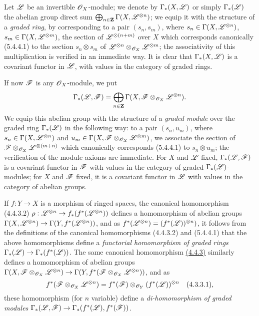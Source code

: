 \begin{env}[5.4.6]
\label{env-0.5.4.6}
Let $\mathscr{L}$ be an invertible $\mathscr{O}_X$-module; we denote by $\Gamma_*(X,\mathscr{L})$
or simply $\Gamma_*(\mathscr{L})$ the abelian group direct sum
$\bigoplus_{n\in\mathbf{Z}}\Gamma(X,\mathscr{L}^{\otimes n})$; we equip it with the
structure of a {\em graded ring}, by corresponding to a pair $(s_n,s_m)$, where
$s_n\in\Gamma(X,\mathscr{L}^{\otimes n})$, $s_m\in\Gamma(X,\mathscr{L}^{\otimes m})$, the
section of $\mathscr{L}^{\otimes(n+m)}$ over $X$ which corresponds canonically
(5.4.4.1) to the section $s_n\otimes s_m$ of
$\mathscr{L}^{\otimes n}\otimes_{\mathscr{O}_X}\mathscr{L}^{\otimes m}$; the associativity of this
multiplication is verified in an immediate way. It is clear that
$\Gamma_*(X,\mathscr{L})$ is a covariant functor in $\mathscr{L}$, with values in the
category of graded rings.

If now $\mathscr{F}$ is any $\mathscr{O}_X$-module, we put
\[
  \Gamma_*(\mathscr{L},\mathscr{F})
  =\bigoplus_{n\in\mathbf{Z}}\Gamma(X,\mathscr{F}\otimes_{\mathscr{O}_X}\mathscr{L}^{\otimes n}).
\]
We equip this abelian group with the structure of a {\em graded module} over
the graded ring $\Gamma_*(\mathscr{L})$ in the following way: to a pair $(s_n,u_m)$,
where $s_n\in\Gamma(X,\mathscr{L}^{\otimes n})$ and
$u_m\in\Gamma(X,\mathscr{F}\otimes_{\mathscr{O}_X}\mathscr{L}^{\otimes m})$, we associate the
section of $\mathscr{F}\otimes_{\mathscr{O}_X}\mathscr{L}^{\otimes(m+n)}$ which canonically
corresponds (5.4.4.1) to $s_n\otimes u_m$; the verification of the module axioms
are immediate. For $X$ and $\mathscr{L}$ fixed, $\Gamma_*(\mathscr{L},\mathscr{F})$ is a
covariant functor in $\mathscr{F}$ with values in the category of graded
$\Gamma_*(\mathscr{L})$-modules; for $X$ and $\mathscr{F}$ fixed, it is a covariant
functor in $\mathscr{L}$ with values in the category of abelian groups.

If $f:Y\to X$ is a morphism of ringed spaces, the canonical homomorphism
(4.4.3.2) $\rho:\mathscr{L}^{\otimes n}\to f_*(f^*(\mathscr{L}^{\otimes n}))$ defines a
homomorphism of abelian groups
$\Gamma(X,\mathscr{L}^{\otimes n})\to\Gamma(Y,f^*(\mathscr{L}^{\otimes n}))$, and as
$f^*(\mathscr{L}^{\otimes n})=(f^*(\mathscr{L}))^{\otimes n})$, it follows from the
definitions of the canonical homomorphisms (4.4.3.2) and (5.4.4.1) that the
above homomorphisms define a {\em functorial homomorphism of graded rings
$\Gamma_*(\mathscr{L})\to\Gamma_*(f^*(\mathscr{L}))$}. The same canonical homomorphism
\hyperref[env-0.4.4.3]{(4.4.3)} similarly defines a homomorphism of abelian groups
$\Gamma(X,\mathscr{F}\otimes_{\mathscr{O}_X}\mathscr{L}^{\otimes n})
  \to\Gamma(Y,f^*(\mathscr{F}\otimes_{\mathscr{O}_X}\mathscr{L}^{\otimes n}))$, and as
\[
  f^*(\mathscr{F}\otimes_{\mathscr{O}_X}\mathscr{L}^{\otimes n})
  =f^*(\mathscr{F})\otimes_{\mathscr{O}_Y}(f^*(\mathscr{L}))^{\otimes n}
  \quad(4.3.3.1),
\]
these homomorphism (for $n$ variable) define a {\em di-homomorphism of graded
modules $\Gamma_*(\mathscr{L},\mathscr{F})\to\Gamma_*(f^*(\mathscr{L}),f^*(\mathscr{F}))$}.
\end{env}

